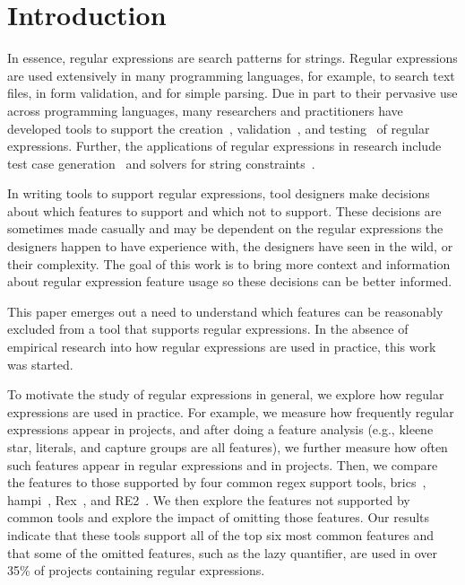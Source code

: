\section{Introduction}

 In essence, regular expressions are search patterns for strings. Regular expressions are used extensively in many programming languages, for example, to search text files, in form validation, and for simple parsing. Due in part to their pervasive use across programming languages, many researchers and practitioners have developed tools to support the creation~\cite{}, validation~\cite{}, and testing~\cite{} of regular expressions. Further, the applications of regular expressions in research  include test case generation~\cite{Ghosh:2013:JAT:2486788.2486925, Galler:2014:STD:2683035.2683100} and solvers for string constraints~\cite{Trinh:2014:SSS:2660267.2660372, hampi}. 

 In writing tools to support regular expressions, tool designers make decisions about which features to support and which not to support. These decisions are sometimes made casually and may be dependent on the regular expressions the designers happen to have experience with, the designers have seen in the wild, or their complexity. The goal of this work is to bring more context and information about regular expression feature usage so these decisions can be better informed. 

This paper emerges out a need to understand which features can be reasonably excluded from a tool that supports regular expressions. In the absence of empirical research into how regular expressions are used in practice, this work was started.

To motivate the study of regular expressions in general, we explore how regular expressions are used in practice. For example, we measure how frequently regular expressions appear in projects, and after doing a feature analysis (e.g., kleene star, literals, and capture groups are all features), we further measure how often such features appear in regular expressions and in projects. Then, we compare the features to those supported by four common regex support tools, brics~\cite{brics}, hampi~\cite{hampi}, Rex~\cite{rex}, and RE2~\cite{re2}. We then explore the features not supported by common tools and explore the impact of omitting those features. Our results indicate that these tools support all of the top six most common features and that some of the omitted features, such as the lazy quantifier, are used in over 35\% of projects containing regular expressions.

